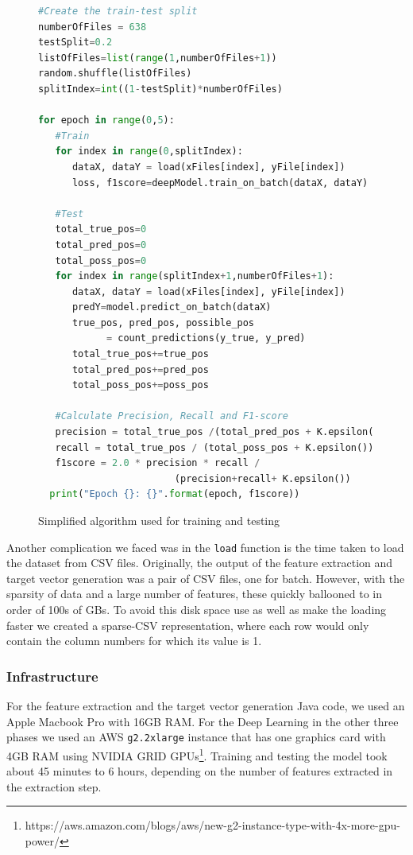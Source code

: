 \documentclass[runningheads,a4paper]{IEEEtran}
\begin{document}
\begin{figure}
\begin{lstlisting}[language=Python,basicstyle=\scriptsize, frame=single]
#Create the train-test split
numberOfFiles = 638
testSplit=0.2
listOfFiles=list(range(1,numberOfFiles+1))
random.shuffle(listOfFiles)
splitIndex=int((1-testSplit)*numberOfFiles)

for epoch in range(0,5):
   #Train
   for index in range(0,splitIndex):
      dataX, dataY = load(xFiles[index], yFile[index])
      loss, f1score=deepModel.train_on_batch(dataX, dataY)

   #Test
   total_true_pos=0
   total_pred_pos=0
   total_poss_pos=0
   for index in range(splitIndex+1,numberOfFiles+1):
      dataX, dataY = load(xFiles[index], yFile[index])
      predY=model.predict_on_batch(dataX)
      true_pos, pred_pos, possible_pos
            = count_predictions(y_true, y_pred)
      total_true_pos+=true_pos
      total_pred_pos+=pred_pos
      total_poss_pos+=poss_pos

   #Calculate Precision, Recall and F1-score
   precision = total_true_pos /(total_pred_pos + K.epsilon())
   recall = total_true_pos / (total_poss_pos + K.epsilon())
   f1score = 2.0 * precision * recall / 
                        (precision+recall+ K.epsilon())
  print("Epoch {}: {}".format(epoch, f1score))
\end{lstlisting}
\caption{Simplified algorithm used for training and testing}
\label{trainTestCode}
\end{figure}

Another complication we faced was in the \texttt{load} function is the time taken to load the dataset from CSV files. Originally, the output of the  feature extraction and target vector generation was a pair of CSV files, one for batch. However, with the sparsity of data and a large number of features, these quickly ballooned to in order of 100s of GBs. To avoid this disk space use as well as make the loading faster we created a sparse-CSV representation, where each row would only contain the column numbers for which its value is 1. 

\subsubsection{Infrastructure}
For the feature extraction and the target vector generation Java code, we used an Apple Macbook Pro with 16GB RAM. For the Deep Learning in the other three phases we used an AWS \texttt{g2.2xlarge} instance that has one graphics card with 4GB RAM using NVIDIA GRID GPUs\footnote{https://aws.amazon.com/blogs/aws/new-g2-instance-type-with-4x-more-gpu-power/}.
Training and testing the model took about 45 minutes to 6 hours, depending on the number of features extracted in the extraction step.
\end{document}
